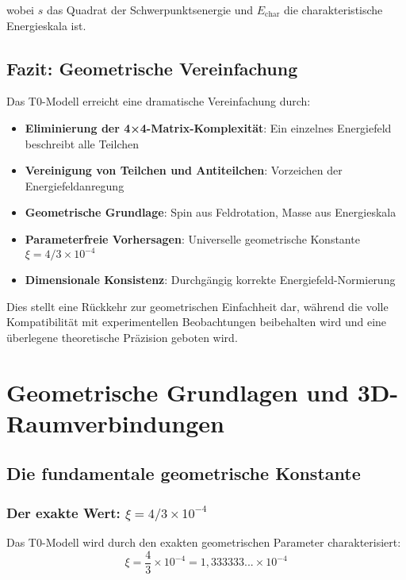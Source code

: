 \documentclass[12pt,a4paper]{report}
\begin{document}
	wobei $s$ das Quadrat der Schwerpunktsenergie und $E_{\text{char}}$ die charakteristische Energieskala ist.
	
	\section{Fazit: Geometrische Vereinfachung}
	\label{sec:conclusion}
	
	Das T0-Modell erreicht eine dramatische Vereinfachung durch:
	
	\begin{itemize}
		\item \textbf{Eliminierung der 4×4-Matrix-Komplexität}: Ein einzelnes Energiefeld beschreibt alle Teilchen
		\item \textbf{Vereinigung von Teilchen und Antiteilchen}: Vorzeichen der Energiefeldanregung
		\item \textbf{Geometrische Grundlage}: Spin aus Feldrotation, Masse aus Energieskala
		\item \textbf{Parameterfreie Vorhersagen}: Universelle geometrische Konstante $\xi = 4/3 \times 10^{-4}$
		\item \textbf{Dimensionale Konsistenz}: Durchgängig korrekte Energiefeld-Normierung
	\end{itemize}
	
	Dies stellt eine Rückkehr zur geometrischen Einfachheit dar, während die volle Kompatibilität mit experimentellen Beobachtungen beibehalten wird und eine überlegene theoretische Präzision geboten wird.
	\chapter{Geometrische Grundlagen und 3D-Raumverbindungen}
	\label{chap:geometric_foundations}
	
	\section{Die fundamentale geometrische Konstante}
	\label{sec:fundamental_geometric_constant}
	
	\subsection{Der exakte Wert: $\xi = 4/3 \times 10^{-4}$}
	\label{subsec:exact_value}
	
	Das T0-Modell wird durch den exakten geometrischen Parameter charakterisiert:
	\begin{equation}
		\boxed{\xi = \frac{4}{3} \times 10^{-4} = 1,333333... \times 10^{-4}}
		\label{eq:xi_exact}
	\end{equation}
	
\end{document}
